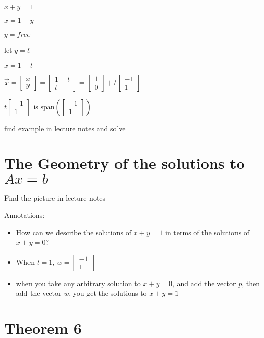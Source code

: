 \documentclass[12pt]{article}
\begin{document}
$x+y = 1$

$x=1-y$

$y=free$

let $y=t$

$x=1-t$

$\vec{x} = 
\begin{bmatrix}
  x \\y 
\end{bmatrix} 
= \begin{bmatrix}
  1-t \\ t
\end{bmatrix}
= \begin{bmatrix}
  1 \\ 0 
\end{bmatrix}
+ t\begin{bmatrix}
  -1 \\ 1
\end{bmatrix}$

$t\begin{bmatrix}
  -1 \\ 1
\end{bmatrix}\text{ is } \text{span}(\begin{bmatrix}
-1 \\ 1
\end{bmatrix})$

find example in lecture notes and solve

\section*{The Geometry of the solutions to $Ax=b$}

Find the picture in lecture notes

Annotations:

\begin{itemize}
\item How can we describe the solutions of $x+y=1$ in terms of the solutions of
  $x+y=0$?
\item When $t=1$, $w=\begin{bmatrix}
    -1 \\ 1
  \end{bmatrix}$
\item when you take any arbitrary solution to $x+y=0$, and add the vector $p$,
  then add the vector $w$, you get the solutions to $x+y=1$
\end{itemize}

\section*{Theorem 6}
\end{document}

